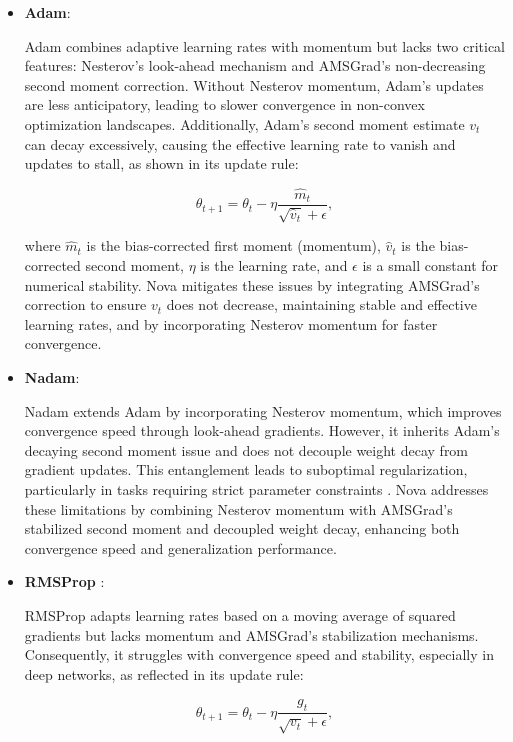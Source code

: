 \documentclass{article}
\begin{document}
\begin{itemize}



\item \textbf{Adam}\cite{kingma2014adam}: 

Adam combines adaptive learning rates with momentum but lacks two critical features: Nesterov’s look-ahead mechanism and AMSGrad’s non-decreasing second moment correction. Without Nesterov momentum, Adam’s updates are less anticipatory, leading to slower convergence in non-convex optimization landscapes. Additionally, Adam’s second moment estimate $v_t$ can decay excessively, causing the effective learning rate to vanish and updates to stall, as shown in its update rule:


\[
\theta_{t+1} = \theta_t - \eta \frac{\hat{m}_t}{\sqrt{\hat{v}_t} + \epsilon},
\]


where $\hat{m}_t$ is the bias-corrected first moment (momentum), $\hat{v}_t$ is the bias-corrected second moment, $\eta$ is the learning rate, and $\epsilon$ is a small constant for numerical stability. Nova mitigates these issues by integrating AMSGrad’s correction \cite{Reddi2018} to ensure $v_t$ does not decrease, maintaining stable and effective learning rates, and by incorporating Nesterov momentum for faster convergence.

\item \textbf{Nadam}\cite{Dozat2016}:

 Nadam extends Adam by incorporating Nesterov momentum, which improves convergence speed through look-ahead gradients. However, it inherits Adam’s decaying second moment issue and does not decouple weight decay from gradient updates. This entanglement leads to suboptimal regularization, particularly in tasks requiring strict parameter constraints \cite{Loshchilov2017}. Nova addresses these limitations by combining Nesterov momentum with AMSGrad’s stabilized second moment and decoupled weight decay, enhancing both convergence speed and generalization performance.

\item \textbf{RMSProp} \cite{Tieleman2012}:

 RMSProp adapts learning rates based on a moving average of squared gradients but lacks momentum and AMSGrad’s stabilization mechanisms. Consequently, it struggles with convergence speed and stability, especially in deep networks, as reflected in its update rule:


\[
\theta_{t+1} = \theta_t - \eta \frac{g_t}{\sqrt{v_t} + \epsilon},
\]



\end{itemize}
\end{document}

